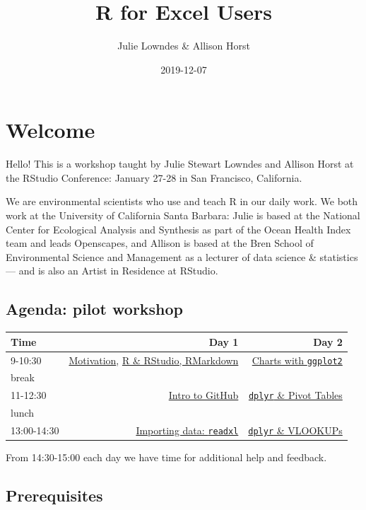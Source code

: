 \documentclass[]{book}
\title{R for Excel Users}
\author{Julie Lowndes \& Allison Horst}
\date{2019-12-07}
\begin{document}
\maketitle

{
\setcounter{tocdepth}{1}
\tableofcontents
}
\hypertarget{welcome}{%
\chapter{Welcome}\label{welcome}}

Hello! This is a workshop taught by Julie Stewart Lowndes and Allison Horst at the RStudio Conference: January 27-28 in San Francisco, California.

We are environmental scientists who use and teach R in our daily work. We both work at the University of California Santa Barbara: Julie is based at the National Center for Ecological Analysis and Synthesis as part of the Ocean Health Index team and leads Openscapes, and Allison is based at the Bren School of Environmental Science and Management as a lecturer of data science \& statistics --- and is also an Artist in Residence at RStudio.

\hypertarget{agenda-pilot-workshop}{%
\section{Agenda: pilot workshop}\label{agenda-pilot-workshop}}

\begin{longtable}[]{@{}lrr@{}}
\toprule
Time & Day 1 & Day 2\tabularnewline
\midrule
\endhead
9-10:30 & \protect\hyperlink{overview}{Motivation}, \protect\hyperlink{rstudio}{R \& RStudio, RMarkdown} & \protect\hyperlink{ggplot2}{Charts with \texttt{ggplot2}}\tabularnewline
break & &\tabularnewline
11-12:30 & \protect\hyperlink{github}{Intro to GitHub} & \protect\hyperlink{dplyr-pivot-tables}{\texttt{dplyr} \& Pivot Tables}\tabularnewline
lunch & &\tabularnewline
13:00-14:30 & \protect\hyperlink{readxl}{Importing data: \texttt{readxl}} & \protect\hyperlink{dplyr-vlookups}{\texttt{dplyr} \& VLOOKUPs}\tabularnewline
\bottomrule
\end{longtable}

From 14:30-15:00 each day we have time for additional help and feedback.

\hypertarget{prerequisites}{%
\section{Prerequisites}\label{prerequisites}}
\end{document}
